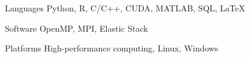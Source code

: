 

\begin{cvskills}

  \cvskill
  {Languages} %
  {Python, R, C/C++, CUDA, MATLAB, SQL, LaTeX} %

  \cvskill
  {Software} %
  {OpenMP, MPI, Elastic Stack} %

  \cvskill
  {Platforms} %
  {High-performance computing, Linux, Windows} %



\end{cvskills}
